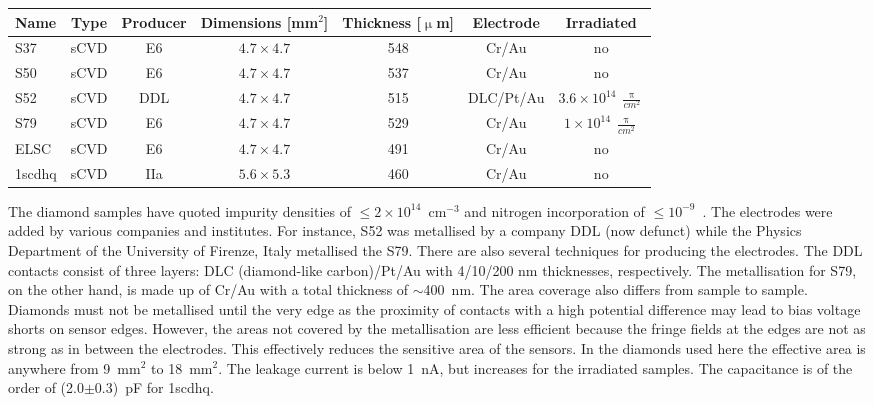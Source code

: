 \begin{footnotesize}
\begin{center}
\begin{tabular}{   l  c  c  c  c c c }
\hline
Name & Type &Producer & Dimensions [mm$^2$] & Thickness [$\upmu$m] & Electrode & Irradiated \\
\hline
S37 & sCVD & E6 & $4.7\times4.7$ & 548 & Cr/Au & no \\
S50 & sCVD & E6 & $4.7\times4.7$ & 537 & Cr/Au & no \\
S52 & sCVD & DDL & $4.7\times4.7$ & 515 & DLC/Pt/Au & $3.6\times10^{14}~\frac{\uppi}{cm^{2}}$ \\
S79 & sCVD & E6 & $4.7\times4.7$ & 529 & Cr/Au & $1\times10^{14}~\frac{\uppi}{cm^{2}}$ \\
ELSC & sCVD & E6 & $4.7\times4.7$ & 491 & Cr/Au & no \\
1scdhq & sCVD & IIa & $5.6\times5.3$ & 460 & Cr/Au & no \\
\hline
\end{tabular}
\label{tab:diamsamp}
\end{center}
\end{footnotesize}

The diamond samples have quoted impurity densities of $\leq2\times10^{14}$~cm$^{-3}$ and nitrogen incorporation of $\leq10^{-9}$~\cite{Jansen:1956431}. The electrodes were added by various companies and institutes. For instance, S52 was metallised by a company DDL (now defunct) while the Physics Department of the University of Firenze, Italy metallised the S79. There are also several techniques for producing the electrodes. The DDL contacts consist of three layers: DLC (diamond-like carbon)/Pt/Au with 4/10/200 nm thicknesses, respectively. The metallisation for S79, on the other hand, is made up of Cr/Au with a total thickness of $\sim$400~nm. The area coverage also differs from sample to sample. Diamonds must not be metallised until the very edge as the proximity of contacts with a high potential difference may lead to bias voltage shorts on sensor edges. However, the areas not covered by the metallisation are less efficient because the fringe fields at the edges are not as strong as in between the electrodes. This effectively reduces the sensitive area of the sensors. In the diamonds used here the effective area is anywhere from 9~mm$^2$ to 18~mm$^2$. The leakage current is below 1~nA, but increases for the irradiated samples. The capacitance is of the order of (2.0$\pm$0.3)~pF for 1scdhq.



